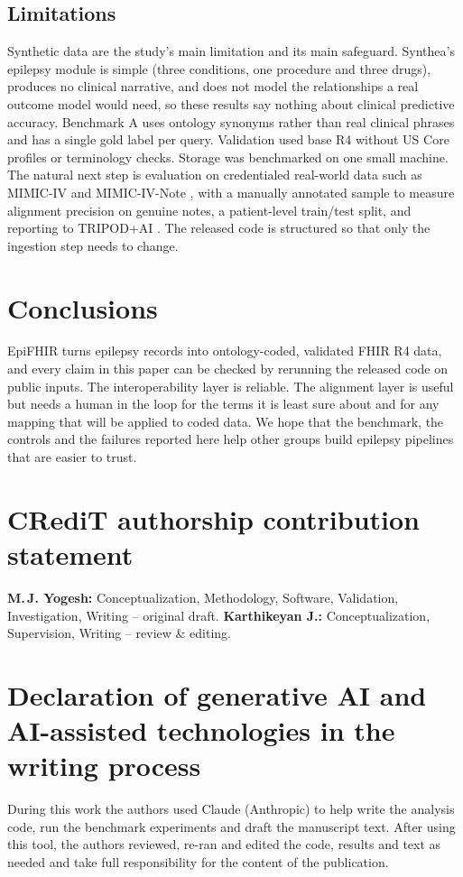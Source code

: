 \documentclass[preprint,12pt]{elsarticle}
\begin{document}
\subsection{Limitations}
Synthetic data are the study's main limitation and its main safeguard. Synthea's epilepsy module is simple (three conditions, one procedure and three drugs), produces no clinical narrative, and does not model the relationships a real outcome model would need, so these results say nothing about clinical predictive accuracy. Benchmark A uses ontology synonyms rather than real clinical phrases and has a single gold label per query. Validation used base R4 without US Core profiles or terminology checks. Storage was benchmarked on one small machine. The natural next step is evaluation on credentialed real-world data such as MIMIC-IV and MIMIC-IV-Note \cite{johnson2023,mimicnote}, with a manually annotated sample to measure alignment precision on genuine notes, a patient-level train/test split, and reporting to TRIPOD+AI \cite{collins2024}. The released code is structured so that only the ingestion step needs to change.

\section{Conclusions}
\label{sec:conclusion}

EpiFHIR turns epilepsy records into ontology-coded, validated FHIR R4 data, and every claim in this paper can be checked by rerunning the released code on public inputs. The interoperability layer is reliable. The alignment layer is useful but needs a human in the loop for the terms it is least sure about and for any mapping that will be applied to coded data. We hope that the benchmark, the controls and the failures reported here help other groups build epilepsy pipelines that are easier to trust.

\section*{CRediT authorship contribution statement}
\textbf{M.\,J. Yogesh:} Conceptualization, Methodology, Software, Validation, Investigation, Writing -- original draft. \textbf{Karthikeyan J.:} Conceptualization, Supervision, Writing -- review \& editing.

\section*{Declaration of generative AI and AI-assisted technologies in the writing process}
During this work the authors used Claude (Anthropic) to help write the analysis code, run the benchmark experiments and draft the manuscript text. After using this tool, the authors reviewed, re-ran and edited the code, results and text as needed and take full responsibility for the content of the publication.
\end{document}
